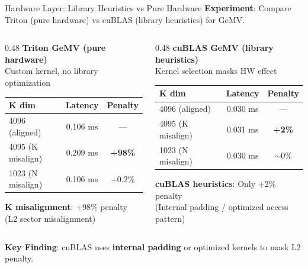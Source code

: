 \documentclass[aspectratio=169,10pt]{beamer}
\begin{document}
\begin{frame}{Hardware Layer: Library Heuristics vs Pure Hardware}
\vspace{-0.2cm}
\small
\textbf{Experiment}: Compare Triton (pure hardware) vs cuBLAS (library heuristics) for GeMV.

\vspace{0.15cm}
\begin{columns}[T]
\begin{column}{0.48\textwidth}
\centering
\textbf{Triton GeMV (pure hardware)}\\[0.1cm]
{\scriptsize Custom kernel, no library optimization}\\[0.1cm]
\begin{tabular}{@{}lcc@{}}
\toprule
K dim & Latency & Penalty \\
\midrule
\rowcolor{cgreen!10} 4096 (aligned) & 0.106 ms & --- \\
\rowcolor{cred!10} 4095 (K misalign) & 0.209 ms & \textcolor{cred}{\textbf{+98\%}} \\
\rowcolor{corange!10} 1023 (N misalign) & 0.106 ms & +0.2\% \\
\bottomrule
\end{tabular}

\vspace{0.2cm}
{\footnotesize \textbf{K misalignment}: +98\% penalty\\
(L2 sector misalignment)}
\end{column}
\begin{column}{0.48\textwidth}
\centering
\textbf{cuBLAS GeMV (library heuristics)}\\[0.1cm]
{\scriptsize Kernel selection masks HW effect}\\[0.1cm]
\begin{tabular}{@{}lcc@{}}
\toprule
K dim & Latency & Penalty \\
\midrule
\rowcolor{cgreen!10} 4096 (aligned) & 0.030 ms & --- \\
\rowcolor{corange!10} 4095 (K misalign) & 0.031 ms & \textcolor{corange}{\textbf{+2\%}} \\
\rowcolor{cgreen!10} 1023 (N misalign) & 0.030 ms & $\sim$0\% \\
\bottomrule
\end{tabular}

\vspace{0.2cm}
{\footnotesize \textbf{cuBLAS heuristics}: Only +2\% penalty\\
(Internal padding / optimized access pattern)}
\end{column}
\end{columns}

\vspace{0.25cm}
\textbf{Key Finding}: cuBLAS uses \textbf{internal padding} or optimized kernels to mask L2 penalty.\\
\end{frame}
\end{document}
